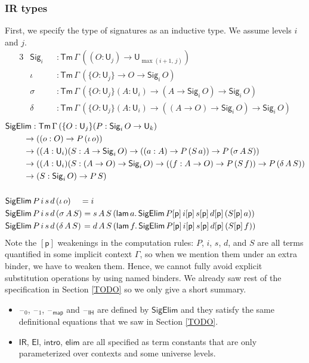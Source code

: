 \documentclass[acmsmall,screen,review,anonymous]{acmart}
\newcommand{\msf}[1]{{\mathsf{#1}}}
\newcommand{\p}{\mathsf{p}}
\newcommand{\U}{\msf{U}}
\newcommand{\El}{\msf{El}}
\newcommand{\Sig}{\msf{Sig}}
\newcommand{\blank}{{\mathord{\hspace{1pt}\text{--}\hspace{1pt}}}}
\newcommand{\IR}{\msf{IR}}
\newcommand{\intro}{\msf{intro}}
\newcommand{\IH}{\msf{IH}}
\newcommand{\map}{\msf{map}}
\newcommand{\elim}{\msf{elim}}
\newcommand{\Tm}{\msf{Tm}}
\newcommand{\lam}{\msf{lam}}
\newcommand{\SigElim}{\msf{SigElim}}
\begin{document}
\subsubsection{IR types} First, we specify the type of signatures as an inductive type. We assume levels $i$
and $j$.
\begin{alignat*}{3}
  &\Sig_i  &&: \Tm\,\Gamma\,((O : \U_j) \to \U_{\max(i+1,\,j)})\\
  &\iota   &&: \Tm\,\Gamma\,(\{O : \U_j\} \to O \to \Sig_i\,O)\\
  &\sigma  &&: \Tm\,\Gamma\,(\{O : \U_j\}(A : \U_i) \to (A \to \Sig_i\,O) \to \Sig_i\,O)\\
  &\delta  &&: \Tm\,\Gamma\,(\{O : \U_j\}(A : \U_i) \to ((A \to O) \to \Sig_i\,O) \to \Sig_i\,O)
\end{alignat*}
\begin{alignat*}{3}
  &\SigElim : \Tm\,\Gamma\,(\{O : \U_j\}(P : \Sig_i\,O \to \U_k)\\
  &           \hspace{2.2em}\to ((o : O) \to P\,(\iota\,o))\\
  &           \hspace{2.2em}\to ((A : \U_i)(S : A \to \Sig_i\,O) \to ((a : A) \to P\,(S\,a)) \to P\,(\sigma\,A\,S))\\
  &           \hspace{2.2em}\to ((A : \U_i)(S : (A \to O) \to \Sig_i\,O) \to ((f : A \to O) \to P\,(S\,f)) \to P\,(\delta\,A\,S))\\
  &           \hspace{2.2em}\to (S : \Sig_i\,O) \to P\,S)\\
  &\\
  &\SigElim\,P\,i\,s\,d\,(\iota\,o) \hspace{1.1em} = i\\
  &\SigElim\,P\,i\,s\,d\,(\sigma\,A\,S) = s\,A\,S\,(\lam\,a.\,\SigElim\,P[\p]\,i[\p]\,s[\p]\,d[\p]\,(S[\p]\,a))\\
  &\SigElim\,P\,i\,s\,d\,(\delta\,A\,S) \hspace{0.1em}= d\,A\,S\,(\lam\,f.\,\SigElim\,P[\p]\,i[\p]\,s[\p]\,d[\p]\,(S[\p]\,f))
\end{alignat*}
Note the $[\p]$ weakenings in the computation rules: $P$, $i$, $s$, $d$, and $S$ are all terms
quantified in some implicit context $\Gamma$, so when we mention them under an extra binder, we have
to weaken them. Hence, we cannot fully avoid explicit substitution operations by using named
binders. We already saw rest of the specification in Section \ref{TODO} so we only give a short
summary.
\begin{itemize}
\item $\blank_0$, $\blank_1$, $\blank_\map$ and $\blank_\IH$ are defined by $\SigElim$ and they satisfy the same definitional equations
  that we saw in Section \ref{TODO}.
\item $\IR$, $\El$, $\intro$, $\elim$ are all specified as term constants that are only parameterized over contexts and some universe levels.
\end{itemize}
\end{document}
